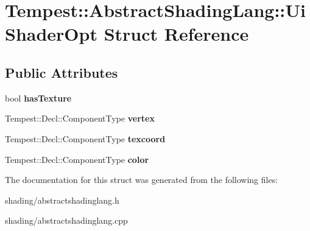 \hypertarget{struct_tempest_1_1_abstract_shading_lang_1_1_ui_shader_opt}{\section{Tempest\+:\+:Abstract\+Shading\+Lang\+:\+:Ui\+Shader\+Opt Struct Reference}
\label{struct_tempest_1_1_abstract_shading_lang_1_1_ui_shader_opt}
}
\subsection*{Public Attributes}
\begin{DoxyCompactItemize}
\item 
\hypertarget{struct_tempest_1_1_abstract_shading_lang_1_1_ui_shader_opt_aa95199280921d7ad13d536b078bfdcc6}{bool {\bfseries has\+Texture}}\label{struct_tempest_1_1_abstract_shading_lang_1_1_ui_shader_opt_aa95199280921d7ad13d536b078bfdcc6}

\item 
\hypertarget{struct_tempest_1_1_abstract_shading_lang_1_1_ui_shader_opt_a0e48180fca786cd23eaccdfca70be2e3}{Tempest\+::\+Decl\+::\+Component\+Type {\bfseries vertex}}\label{struct_tempest_1_1_abstract_shading_lang_1_1_ui_shader_opt_a0e48180fca786cd23eaccdfca70be2e3}

\item 
\hypertarget{struct_tempest_1_1_abstract_shading_lang_1_1_ui_shader_opt_a88472d8ae2642cd35a4a7beb1f4d8342}{Tempest\+::\+Decl\+::\+Component\+Type {\bfseries texcoord}}\label{struct_tempest_1_1_abstract_shading_lang_1_1_ui_shader_opt_a88472d8ae2642cd35a4a7beb1f4d8342}

\item 
\hypertarget{struct_tempest_1_1_abstract_shading_lang_1_1_ui_shader_opt_a4ad74216a739ae04464c0dc06ad4ff4a}{Tempest\+::\+Decl\+::\+Component\+Type {\bfseries color}}\label{struct_tempest_1_1_abstract_shading_lang_1_1_ui_shader_opt_a4ad74216a739ae04464c0dc06ad4ff4a}

\end{DoxyCompactItemize}


The documentation for this struct was generated from the following files\+:\begin{DoxyCompactItemize}
\item 
shading/abstractshadinglang.\+h\item 
shading/abstractshadinglang.\+cpp\end{DoxyCompactItemize}
